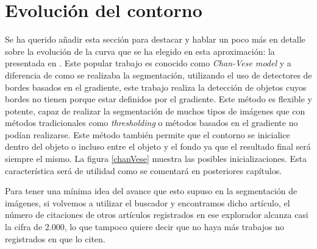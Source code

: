  
 
\section{Evoluci\'{o}n del contorno}

Se ha querido a\~{n}adir esta secci\'{o}n para destacar y hablar un poco m\'{a}s en detalle sobre la evoluci\'{o}n de la curva que se ha elegido en esta aproximaci\'{o}n: la presentada en \cite{chan}. Este popular trabajo es conocido como \textit{Chan-Vese model} y a diferencia de como se realizaba la segmentaci\'{o}n, utilizando el uso de detectores de bordes basados en el gradiente, este trabajo realiza la detecci\'{o}n de objetos cuyos bordes no tienen porque estar definidos por el gradiente. Este m\'{e}todo es flexible y potente, capaz de realizar la segmentaci\'{o}n de muchos tipos de im\'{a}genes que con m\'{e}todos tradicionales como \textit{thresholding} o m\'{e}todos basados en el gradiente no pod\'{i}an realizarse. Este m\'{e}todo tambi\'{e}n permite que el contorno se inicialice dentro del objeto o incluso entre el objeto y el fondo ya que el resultado final ser\'{a} siempre el mismo. La figura \ref{chanVese} muestra las posibles inicializaciones. Esta caracter\'{i}stica ser\'{a} de utilidad como se comentar\'{a} en posteriores cap\'{i}tulos.

Para tener una m\'{i}nima idea del avance que esto supuso en la segmentaci\'{o}n de im\'{a}genes, si volvemos a utilizar el buscador \cite{ieee1} y encontramos dicho art\'{i}culo, el n\'{u}mero de citaciones de otros art\'{i}culos registrados en ese explorador alcanza casi la cifra de 2.000, lo que tampoco quiere decir que no haya m\'{a}s trabajos no registrados en \cite{ieee1} que lo citen. 
 
